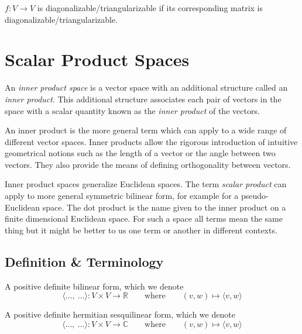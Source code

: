 \begin{definition}
   \(f: V \to V\) is diagonalizable/triangularizable if its corresponding matrix is diagonalizable/triangularizable.
\end{definition}

\newpage


\section{Scalar Product Spaces}
An \emph{inner product space} is a vector space with an additional structure called an \emph{inner product}.
This additional structure associates each pair of vectors in the space with a scalar quantity known as the \emph{inner product} of the vectors.

An inner product is the more general term which can apply to a wide range of different vector spaces.
Inner products allow the rigorous introduction of intuitive geometrical notions such as the length of a vector or the angle between two vectors.
They also provide the means of defining orthogonality between vectors.

Inner product spaces generalize Euclidean spaces.
The term \emph{scalar product} can apply to more general symmetric bilinear form, for example for a pseudo-Euclidean space.
The dot product is the name given to the inner product on a finite dimensional Euclidean space. For such a space all terms mean the same thing but it might be better to us one term or another in different contexts.
\subsection{Definition \& Terminology}
\begin{definition}\label{def:scalar_product}
   A positive definite bilinear form, which we denote
   \[\langle \ldots,~ \ldots\rangle: V \times V \to \mathbb{R} \qquad\text{where}\qquad (v, w) \mapsto \langle v, w\rangle\]
\end{definition}

\begin{definition}
   A positive definite hermitian sesquilinear form, which we denote
   \[\langle \ldots,~ \ldots\rangle: V \times V \to \mathbb{C} \qquad\text{where}\qquad (v, w) \mapsto \langle v, w\rangle\]
\end{definition}

